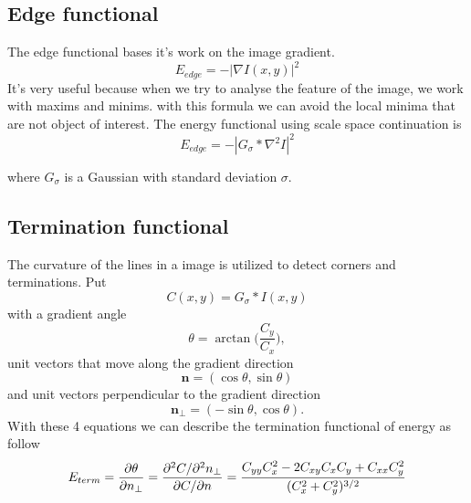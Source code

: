 \subsection{Edge functional}
The edge functional bases it's work on the image gradient.
\begin{equation}
E_{{edge}}=-\left|\nabla I(x,y)\right\vert ^{2}
\end{equation}
It's very useful because when we try to analyse the feature of the image, we work with maxims and minims. with this formula we can avoid the local minima that are not object of interest. The energy functional using scale space continuation is
\begin{equation}
E_{edge}=-\left|G_{\sigma }*\nabla ^{2}I\right\vert ^{2}
\end{equation}

where $ G_{\sigma } $ is a Gaussian with standard deviation $ \sigma $.

\subsection{Termination functional}
The curvature of the lines in a image is utilized to detect corners and terminations. Put 
\begin{equation}
C(x,y)=G_{{\sigma }}*I(x,y)
\end{equation}
with a gradient angle
\begin{equation}
\theta =\arctan {\Bigg (}{\frac  {C_{y}}{C_{x}}}{\Bigg )},
\end{equation}
unit vectors that move along the gradient direction 
\begin{equation}
{\mathbf  n}=(\cos \theta ,\sin \theta )
\end{equation}
and unit vectors perpendicular to the gradient direction
\begin{equation}
{\mathbf  n}_{{\perp }}=(-\sin \theta ,\cos \theta ).
\end{equation}
With these 4 equations we can describe the termination functional of energy as follow
\begin{equation}
E_{{term}}={\partial \theta  \over \partial n_{{\perp }}}={\partial ^{2}C/\partial ^{2}n_{{\perp }} \over \partial C/\partial n}={{C_{{yy}}C_{x}^{2}-2C_{{xy}}C_{x}C_{y}+C_{{xx}}C_{y}^{2}} \over (C_{x}^{2}+C_{y}^{2})^{{3/2}}}
\end{equation}

